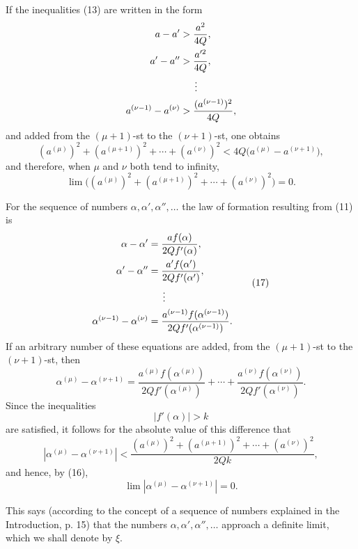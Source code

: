 
If the inequalities (13) are written in the form
\[
\begin{aligned}
 a-a'&>\frac{a^2}{4Q},\\
 a'-a''&>\frac{a'^2}{4Q},\\
 &\hspace{1.5em}\vdots\\
 a^{(\nu-1)}-a^{(\nu)}&>\frac{(a^{(\nu-1)})^2}{4Q},
\end{aligned}
\]
and added from the $(\mu+1)$-st to the $(\nu+1)$-st, one obtains
\[
 (a^{(\mu)})^2+(a^{(\mu+1)})^2+\cdots+(a^{(\nu)})^2
 <4Q\bigl(a^{(\mu)}-a^{(\nu+1)}\bigr),
\]
and therefore, when $\mu$ and $\nu$ both tend to infinity,
\begin{equation}
 \lim\bigl((a^{(\mu)})^2+(a^{(\mu+1)})^2+\cdots+(a^{(\nu)})^2\bigr)=0.
\tag{16}
\end{equation}

For the sequence of numbers $\alpha,\alpha',\alpha'',\ldots$ the law of formation resulting from (11) is
\begin{equation}
\begin{aligned}
 \alpha-\alpha'&=\frac{a f(\alpha)}{2Q f'(\alpha)},\\
 \alpha'-\alpha''&=\frac{a' f(\alpha')}{2Q f'(\alpha')},\\
 &\hspace{1.5em}\vdots\\
 \alpha^{(\nu-1)}-\alpha^{(\nu)}&=
 \frac{a^{(\nu-1)} f(\alpha^{(\nu-1)})}{2Q f'(\alpha^{(\nu-1)})}.
\end{aligned}
\tag{17}
\end{equation}
If an arbitrary number of these equations are added, from the $(\mu+1)$-st to the $(\nu+1)$-st, then
\begin{equation}
 \alpha^{(\mu)}-\alpha^{(\nu+1)}=
 \frac{a^{(\mu)}f(\alpha^{(\mu)})}{2Q f'(\alpha^{(\mu)})}+\cdots+
 \frac{a^{(\nu)}f(\alpha^{(\nu)})}{2Q f'(\alpha^{(\nu)})}.
\tag{18}
\end{equation}
Since the inequalities
\[
 |f'(\alpha)|>k
\]
are satisfied, it follows for the absolute value of this difference that
\begin{equation}
 |\alpha^{(\mu)}-\alpha^{(\nu+1)}|<
 \frac{(a^{(\mu)})^2+(a^{(\mu+1)})^2+\cdots+(a^{(\nu)})^2}{2Qk},
\tag{19}
\end{equation}
and hence, by (16),
\begin{equation}
 \lim |\alpha^{(\mu)}-\alpha^{(\nu+1)}|=0.
\tag{20}
\end{equation}

This says (according to the concept of a sequence of numbers explained in the Introduction, p. 15) that the numbers $\alpha,\alpha',\alpha'',\ldots$ approach a definite limit, which we shall denote by $\xi$.
